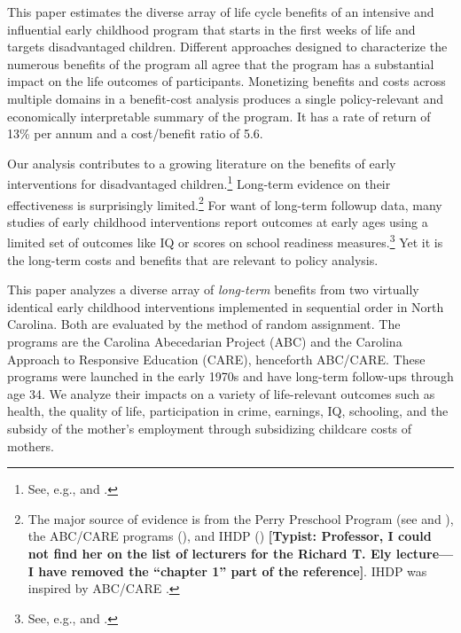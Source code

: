 This paper estimates the diverse array of life cycle benefits of an intensive and influential early childhood program that starts in the first weeks of life and targets disadvantaged children. Different approaches designed to characterize the numerous benefits of the program all agree that the program has a substantial impact on the life outcomes of participants. Monetizing benefits and costs across multiple domains in a benefit-cost analysis produces a single policy-relevant and economically interpretable summary of the program. It has a rate of return of 13\% per annum and a cost/benefit ratio of 5.6. 

Our analysis contributes to a growing literature on the benefits of early interventions for disadvantaged children.\footnote{See, e.g., \cite{Currie_2011_AER} and \cite{Elango_Hojman_etal_2016_Early-Edu}.} Long-term evidence on their effectiveness is surprisingly limited.\footnote{The major source of evidence is from the Perry Preschool Program (see \citealp{Schweinhart_Montie_ea_2005_BOOKlifetime} and \citealp{Heckman_Moon_etal_2010_RateofReturn,Heckman_Moon_etal_2010_QE}), the ABC/CARE programs (\citealp{Ramey_Campbell_etal_2000_ADS,Ramey-etal_2012-ABC}), and IHDP (\citealp{Gross_Spiker_etal_1997_BOOKHelpinglowbirth,Duncan_Sojourner_2013_JHR}) \textbf{[Typist: Professor, I could not find her on the list of lecturers for the Richard T. Ely lecture---I have removed the ``chapter 1'' part of the reference]}. IHDP was inspired by ABC/CARE \citep[][]{Gross_Spiker_etal_1997_BOOKHelpinglowbirth}.} For want of long-term followup data, many studies of early childhood interventions report outcomes at early ages using a limited set of outcomes like IQ or scores on school readiness measures.\footnote{See, e.g., \cite{Kline_Walters_2014_EvaluatingPublicPrograms} and \cite{Weiland_2013_CD_Impacts-of-Pre-K}.} Yet it is the long-term costs and benefits that are relevant to policy analysis.

This paper analyzes a diverse array of \emph{long-term} benefits from two virtually identical early childhood interventions implemented in sequential order in North Carolina. Both are evaluated by the method of random assignment. The programs are the Carolina Abecedarian Project (ABC) and the Carolina Approach to Responsive Education (CARE), henceforth ABC/CARE. These programs were launched in the early 1970s and have long-term follow-ups through age 34. We analyze their impacts on a variety of life-relevant outcomes such as health, the quality of life, participation in crime, earnings, IQ, schooling, and the subsidy of the mother's employment through subsidizing childcare costs of mothers.

